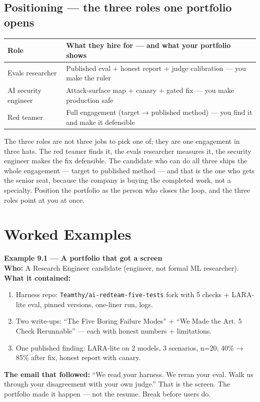 \subsection{Positioning — the three roles one portfolio opens}
\begin{center}
\begin{tabularx}{\linewidth}{lX}
\toprule
Role & What they hire for — and what your portfolio shows \\
\midrule
Evals researcher & Published eval + honest report + judge calibration — you make the ruler \\
AI security engineer & Attack-surface map + canary + gated fix — you make production safe \\
Red teamer & Full engagement (target → published method) — you find it and make it defensible \\
\bottomrule
\end{tabularx}
\end{center}

The three roles are not three jobs to pick one of; they are one engagement in three hats. The red teamer finds it, the evals researcher measures it, the security engineer makes the fix defensible. The candidate who can do all three ships the whole engagement — target to published method — and that is the one who gets the senior seat, because the company is buying the completed work, not a specialty. Position the portfolio as the person who closes the loop, and the three roles point at you at once.

\section{Worked Examples}
\tierP

\begin{examplebox}
\textbf{Example 9.1 — A portfolio that got a screen}\\
\textbf{Who:} A Research Engineer candidate (engineer, not formal ML researcher).\\
\textbf{What it contained:}
\begin{enumerate}
\item Harness repo: \texttt{Teamthy/ai-redteam-five-tests} fork with 5 checks + LARA-lite eval, pinned versions, one-liner run, logs.
\item Two write-ups: ``The Five Boring Failure Modes'' + ``We Made the Art. 5 Check Rerunnable'' — each with honest numbers + limitations.
\item One published finding: LARA-lite on 2 models, 3 scenarios, n=20, 40\% → 85\% after fix, honest report with canary.
\end{enumerate}
\textbf{The email that followed:} ``We read your harness. We reran your eval. Walk us through your disagreement with your own judge.'' That is the screen. The portfolio made it happen — not the resume. Break before users do.
\end{examplebox}

